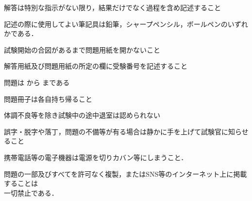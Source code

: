 \item\;  解答は特別な指示がない限り，結果だけでなく過程を含め記述すること
\item\;  記述の際に使用してよい筆記具は鉛筆，シャープペンシル，ボールペンのいずれかである．
\item\;  試験開始の合図があるまで問題用紙を開かないこと
\item\;  解答用紙及び問題用紙の所定の欄に受験番号を記述すること
\item\;  問題は\,\,から\,\fbox{\amountq}\,まである
\item\;  問題冊子は各自持ち帰ること
\item\;  体調不良等を除き試験中の途中退室は認められない
\item\;  誤字・脱字や落丁，問題の不備等が有る場合は静かに手を上げて試験官に知らせること
\item\;  携帯電話等の電子機器は電源を切りカバン等にしまうこと．
\item\;  問題の一部及びすべてを許可なく複製，またはSNS等のインターネット上に掲載することは\\[2mm]
         \hspace{0.2cm}一切禁止である．